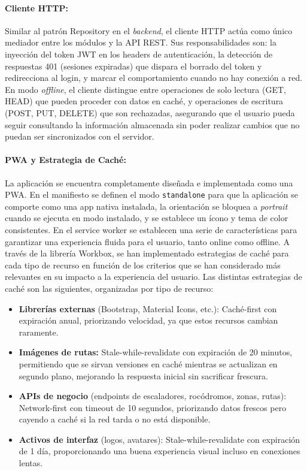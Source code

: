 \paragraph{Cliente HTTP:} Similar al patrón Repository en el \textit{backend}, el cliente HTTP actúa como único mediador entre los módulos y la API REST. Sus responsabilidades son: la inyección del token JWT en los headers de autenticación, la detección de respuestas 401 (sesiones expiradas) que dispara el borrado del token y redirecciona al login, y  marcar el comportamiento cuando no hay conexión a red. En modo \textit{offline}, el cliente distingue entre operaciones de solo lectura (GET, HEAD) que pueden proceder con datos en caché, y operaciones de escritura (POST, PUT, DELETE) que son rechazadas, asegurando que el usuario pueda seguir consultando la información almacenada sin poder realizar cambios que no puedan ser sincronizados con el servidor.

\paragraph{PWA y Estrategia de Caché:} La aplicación se encuentra completamente diseñada e implementada como una PWA. 
En el manifiesto se definen  el modo \texttt{standalone} para que la aplicación se comporte como una app nativa instalada, la orientación se bloquea 
a \textit{portrait} cuando se ejecuta en modo instalado, y se establece un ícono y tema de color consistentes.
En el service worker se establecen una serie de características para garantizar una experiencia fluida para el usuario, 
tanto online como offline. A través de la librería Workbox, se han implementado estrategias de caché para cada tipo de recurso en función de los criterios que se han considerado más relevantes en su impacto a la experiencia del usuario.
Las distintas estrategias de caché son las siguientes, organizadas por tipo de recurso:

\begin{itemize}
    \item \textbf{Librerías externas} (Bootstrap, Material Icons, etc.): Caché-first con expiración anual, priorizando velocidad, ya que estos recursos cambian raramente.
    
    \item \textbf{Imágenes de rutas:} Stale-while-revalidate con expiración de 20 minutos, permitiendo que se sirvan versiones en caché mientras se actualizan en segundo plano, mejorando la respuesta inicial sin sacrificar frescura.
    
    \item \textbf{APIs de negocio} (endpoints de escaladores, rocódromos, zonas, rutas): Network-first con timeout de 10 segundos, priorizando datos frescos pero cayendo a caché si la red tarda o no está disponible.
    
    \item \textbf{Activos de interfaz} (logos, avatares): Stale-while-revalidate con expiración de 1 día, proporcionando una buena     experiencia visual incluso en conexiones lentas.
\end{itemize}

